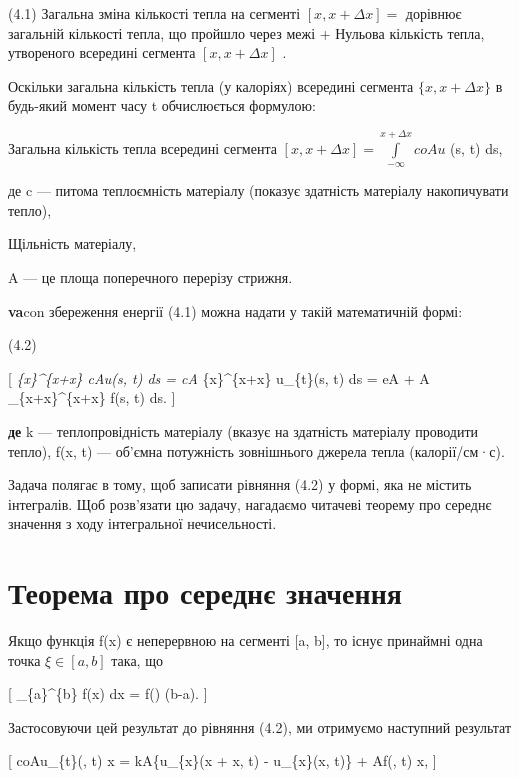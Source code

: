 \documentclass[
  ukrainian,
]{article}
\begin{document}
(4.1) Загальна зміна кількості тепла на сегменті \([x, x + \Delta x] =\)
дорівнює загальній кількості тепла, що пройшло через межі + Нульова
кількість тепла, утвореного всередині сегмента \([x, x + \Delta x]\) .

Оскільки загальна кількість тепла (у калоріях) всередині сегмента
\(\{x, x + \Delta x\}\) в будь-який момент часу t обчислюється формулою:

Загальна кількість тепла всередині сегмента
\([x, x+\Delta x] = \int\limits_{-\infty}^{x+\Delta x} coAu\) (s, t) ds,

де c --- питома теплоємність матеріалу (показує здатність матеріалу
накопичувати тепло),

Щільність матеріалу,

A --- це площа поперечного перерізу стрижня.

\textbf{va}con збереження енергії (4.1) можна надати у такій
математичній формі:

(4.2)

{[}  \int\emph{\{x\}\^{}\{x+\Delta x\} c\rho Au(s, t) ds =
c\rho A \int}\{x\}\^{}\{x+\Delta x\} u\_\{t\}(s, t) ds = eA
 + A
\int\_\{x+\Delta x\}\^{}\{x+\Delta x\} f(s, t) ds. {]}

\textbf{де} k --- теплопровідність матеріалу (вказує на здатність
матеріалу проводити тепло), f(x, t) --- об'ємна потужність зовнішнього
джерела тепла (калорії/см·с).

Задача полягає в тому, щоб записати рівняння (4.2) у формі, яка не
містить інтегралів. Щоб розв'язати цю задачу, нагадаємо читачеві теорему
про середнє значення з ходу інтегральної нечисельності.

\section{Теорема про середнє
значення}\label{ux442ux435ux43eux440ux435ux43cux430-ux43fux440ux43e-ux441ux435ux440ux435ux434ux43dux454-ux437ux43dux430ux447ux435ux43dux43dux44f}

Якщо функція f(x) є неперервною на сегменті {[}a, b{]}, то існує
принаймні одна точка \(\xi \in [a, b]\) така, що

{[} \int\_\{a\}\^{}\{b\} f(x) dx = f(\xi) (b-a). {]}

Застосовуючи цей результат до рівняння (4.2), ми отримуємо наступний
результат

{[} coAu\_\{t\}(\xi, t) \Delta x = kA\{u\_\{x\}(x + \Delta x, t) -
u\_\{x\}(x, t)\} + Af(\xi, t) \Delta x, {]}
\end{document}

